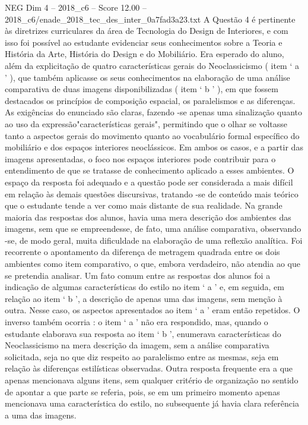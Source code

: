 \begin{textsample}{NEG Dim 4 – 2018\_c6 – Score 12.00 – 2018\_c6/enade\_2018\_tec\_des\_inter\_0a7fad3a23.txt}
A Questão 4 é pertinente às diretrizes curriculares da área de Tecnologia do Design de Interiores, e com isso foi possível ao estudante evidenciar seus conhecimentos sobre a Teoria e História da Arte, História do Design e do Mobiliário.
Era esperado do aluno, além da explicitação de quatro características gerais do Neoclassicismo ( item ‘ a ’ ), que também aplicasse os seus conhecimentos na elaboração de uma análise comparativa de duas imagens disponibilizadas ( item ‘ b ’ ), em que fossem destacados os princípios de composição espacial, os paralelismos e as diferenças.
As exigências do enunciado são claras, fazendo -se apenas uma sinalização quanto ao uso da expressão"características gerais", permitindo que o olhar se voltasse tanto a aspectos gerais do movimento quanto ao vocabulário formal específico do mobiliário e dos espaços interiores neoclássicos.
Em ambos os casos, e a partir das imagens apresentadas, o foco nos espaços interiores pode contribuir para o entendimento de que se tratasse de conhecimento aplicado a esses ambientes.
O espaço da resposta foi adequado e a questão pode ser considerada a mais difícil em relação às demais questões discursivas, tratando -se de conteúdo mais teórico que o estudante tende a ver como mais distante de sua realidade.
Na grande maioria das respostas dos alunos, havia uma mera descrição dos ambientes das imagens, sem que se empreendesse, de fato, uma análise comparativa, observando -se, de modo geral, muita dificuldade na elaboração de uma reflexão analítica.
Foi recorrente o apontamento da diferença de metragem quadrada entre os dois ambientes como item comparativo, o que, embora verdadeiro, não atendia ao que se pretendia analisar.
Um fato comum entre as respostas dos alunos foi a indicação de algumas características do estilo no item ‘ a ’ e, em seguida, em relação ao item ‘ b ’, a descrição de apenas uma das imagens, sem menção à outra.
Nesse caso, os aspectos apresentados ao item ‘ a ’ eram então repetidos.
O inverso também ocorria : o item ‘ a ’ não era respondido, mas, quando o estudante elaborava sua resposta ao item ‘ b ’, enumerava características do Neoclassicismo na mera descrição da imagem, sem a análise comparativa solicitada, seja no que diz respeito ao paralelismo entre as mesmas, seja em relação às diferenças estilísticas observadas.
Outra resposta frequente era a que apenas mencionava alguns itens, sem qualquer critério de organização no sentido de apontar a que parte se referia, pois, se em um primeiro momento apenas mencionava uma característica do estilo, no subsequente já havia clara referência a uma das imagens.

\end{textsample}
